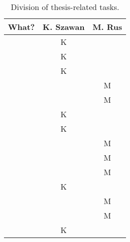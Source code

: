 \begin{table}[h]
	\centering
	\begin{tabular}{l|c|c}
		What? & K. Szawan & M. Rus \\
		\hline
		\Cref{chap:introduction} & K & \\
		\Cref{sec:xmind} & K & \\
		\Cref{sec:android-theory} & K & \\
		\Cref{sec:scala} &  & M \\
		\Cref{sec:akka} &  & M \\
		\Cref{sec:requirements} & K  &  \\
		\Cref{sec:plan}  & K &  \\
		\Cref{subsec:component-android} &   & M \\
		\Cref{subsec:component-akka}   &   & M \\
		\Cref{subsec:data-repr}  &   & M \\
		\Cref{subsec:xmind-exchange}  & K  &  \\
		\Cref{subsec:android-akka-comm}  &   & M \\
		\Cref{subsec:subtree-recreation}  &   & M \\		
		\Cref{subsec:ui-mockups}  & K  &  \\
	\end{tabular}
	\caption{Division of thesis-related tasks.}
	\label{tab:who-did-docs}
\end{table}
